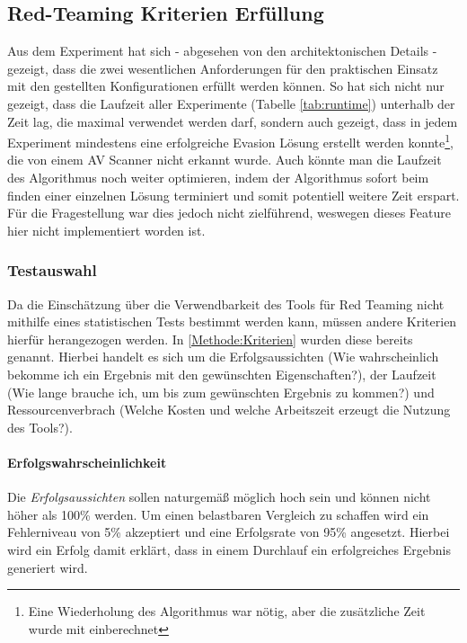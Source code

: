 \subsection{Red-Teaming Kriterien Erfüllung}
Aus dem Experiment hat sich - abgesehen von den architektonischen Details - gezeigt, dass die zwei wesentlichen Anforderungen für den praktischen Einsatz mit den gestellten Konfigurationen erfüllt werden können.
So hat sich nicht nur gezeigt, dass die Laufzeit aller Experimente (Tabelle \ref{tab:runtime}) unterhalb der Zeit lag, die maximal verwendet werden darf, sondern auch gezeigt, dass in jedem Experiment mindestens eine erfolgreiche Evasion Lösung erstellt werden konnte\footnote{Eine Wiederholung des Algorithmus war nötig, aber die zusätzliche Zeit wurde mit einberechnet}, die von einem AV Scanner nicht erkannt wurde. Auch könnte man die Laufzeit des Algorithmus noch weiter optimieren, indem der Algorithmus sofort beim finden einer einzelnen Lösung terminiert und somit potentiell weitere Zeit erspart. Für die Fragestellung war dies jedoch nicht zielführend, weswegen dieses Feature hier nicht implementiert worden ist.

\subsubsection{Testauswahl}
Da die Einschätzung über die Verwendbarkeit des Tools für Red Teaming nicht mithilfe eines statistischen Tests bestimmt werden kann, müssen andere Kriterien hierfür herangezogen werden. In \ref{Methode:Kriterien} wurden diese bereits genannt. Hierbei handelt es sich um die Erfolgsaussichten (Wie wahrscheinlich bekomme ich ein Ergebnis mit den gewünschten Eigenschaften?), der Laufzeit (Wie lange brauche ich, um bis zum gewünschten Ergebnis zu kommen?) und Ressourcenverbrach (Welche Kosten und welche Arbeitszeit erzeugt die Nutzung des Tools?).
\paragraph{Erfolgswahrscheinlichkeit}
Die \textit{Erfolgsaussichten} sollen naturgemäß möglich hoch sein und können nicht höher als 100\% werden. Um einen belastbaren Vergleich zu schaffen wird ein Fehlerniveau von 5\% akzeptiert und eine Erfolgsrate von 95\% angesetzt. Hierbei wird ein Erfolg damit erklärt, dass in einem Durchlauf ein erfolgreiches Ergebnis generiert wird. 
